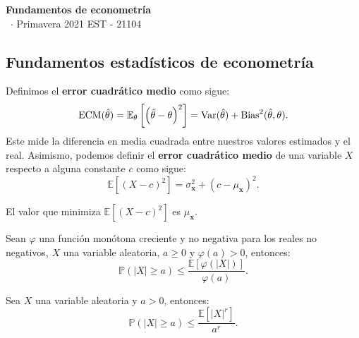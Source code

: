 \documentclass[8pt,a4paper]{extarticle}
\renewcommand{\csClass}{Fundamentos de econometría}
\renewcommand{\csClassCode}{EST - 21104}
\renewcommand{\csTerm}{Primavera 2021}
\begin{document}
\begin{titlepage}
    \begin{center}
	\vspace*{1cm}
	\Huge
        \textbf{\csClass}
	\vspace{0.5cm} \\
	\Large
        \cs\ $\cdot$ \csTerm
        \vfill
        \csAuthorName
	\vspace{0.8cm}
        \csClassCode\\
        \csSchool     
    \end{center}
\end{titlepage}

\begin{multicols}{3}
\setcounter{page}{1}

\section{Fundamentos estadísticos de econometría}

\begin{boxdef}
	Definimos el \textbf{error cuadrático medio} como sigue:
	\[
		\text{\normalfont ECM} (\hat{\theta}) = \mathbb{E}_{\theta} \left[ \left( \hat{\theta} - \theta \right)^2  \right]  = \text{\normalfont Var} (\hat{\theta}) + \text{\normalfont Bias}^{2} (\hat{\theta}, \theta)
	.\] 
	Este mide la diferencia en media cuadrada entre nuestros valores estimados y el real. Asimismo, podemos definir el \textbf{error cuadrático medio} de una variable $X$ respecto a alguna constante $c$ como sigue:
	\[
		\mathbb{E} \left[ (X - c)^2 \right] = \sigma^2_{\mathbf{x}} + (c - \mu_\mathbf{x})^2
	.\] 
\end{boxdef} 

\begin{boxtheo}
	El valor que minimiza $\mathbb{E}\left[(X-c)^2\right]$ es $\mu_{\mathbf{x}}$.
\end{boxtheo}

\begin{boxcor}
	Sean $\varphi$ una función monótona creciente y no negativa para los reales no negativos, $X$ una variable aleatoria, $a \ge 0$ y $\varphi(a) > 0$, entonces:
	\[
		\mathbb{P}\left( \left| X \right| \ge a \right) \le \frac{\mathbb{E}\left[ \varphi \left( \left| X \right|  \right)  \right] }{\varphi(a)}
	.\] 
\end{boxcor}

\begin{boxcor}
	Sea $X$ una variable aleatoria y $a > 0$, entonces:
	\[
		\mathbb{P}\left( \left| X \right| \ge a  \right) \le \frac{\mathbb{E}\left[ \left| X \right|^r  \right] }{a^r}
	.\] 
\end{boxcor}


\end{multicols}
\end{document}
